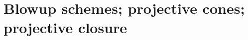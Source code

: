 \section{Blowup schemes; projective cones; projective closure}
\label{section-blowup-schemes-projective-cones-closure}

